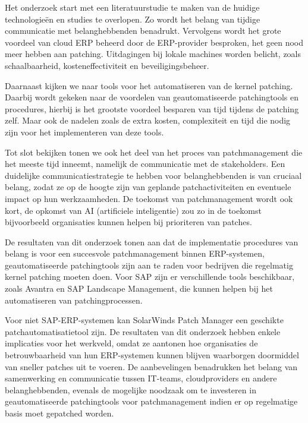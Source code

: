 Het onderzoek start met een literatuurstudie te maken van de huidige technologieën en studies te overlopen. Zo wordt het belang van tijdige communicatie met belanghebbenden benadrukt. Vervolgens wordt het grote voordeel van cloud ERP beheerd door de ERP-provider besproken, het geen nood meer hebben aan patching. Uitdagingen bij lokale machines worden belicht, zoals schaalbaarheid, kosteneffectiviteit en beveiligingsbeheer.

Daarnaast kijken we naar tools voor het automatiseren van de kernel patching. Daarbij wordt gekeken naar de voordelen van geautomatiseerde patchingtools en procedures, hierbij is het grootste voordeel besparen van tijd tijdens de patching zelf. Maar ook de nadelen zoals de extra kosten, complexiteit en tijd die nodig zijn voor het implementeren van deze tools.

Tot slot bekijken tonen we ook het deel van het proces van patchmanagement die het meeste tijd inneemt, namelijk de communicatie met de stakeholders. Een duidelijke communicatiestrategie te hebben voor belanghebbenden is van cruciaal belang, zodat ze op de hoogte zijn van geplande patchactiviteiten en eventuele impact op hun werkzaamheden. De toekomst van patchmanagement wordt ook kort, de opkomst van AI (artificiele inteligentie) zou zo in de toekomst bijvoorbeeld organisaties kunnen helpen bij prioriteren van patches.

De resultaten van dit onderzoek tonen aan dat de implementatie procedures van belang is voor een succesvole patchmanagement binnen ERP-systemen, geautomatiseerde patchingtools zijn aan te raden voor bedrijven die regelmatig kernel patching moeten doen. Voor SAP zijn er verschillende tools beschikbaar, zoals Avantra en SAP Landscape Management, die kunnen helpen bij het automatiseren van patchingprocessen. 

Voor niet SAP-ERP-systemen kan SolarWinds Patch Manager een geschikte patchautomatisatietool zijn. De resultaten van dit onderzoek hebben enkele implicaties voor het werkveld, omdat ze aantonen hoe organisaties de betrouwbaarheid van hun ERP-systemen kunnen blijven waarborgen doormiddel van sneller patches uit te voeren. De aanbevelingen benadrukken het belang van samenwerking en communicatie tussen IT-teams, cloudproviders en andere belanghebbenden, evenals de mogelijke noodzaak om te investeren in geautomatiseerde patchingtools voor patchmanagement indien er op regelmatige basis moet gepatched worden.